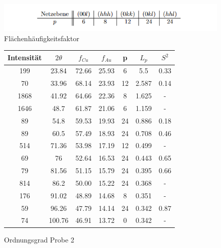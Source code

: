                \begin{figure}
                    \centering
                    \includegraphics{images/flächenhäufigkeitsfaktor.PNG}
                    \caption{Flächenhäufigkeitsfaktor}
                \end{figure}

                \begin{figure}[H]
                    \centering
                    \begin{tabular}{c | c | c | c | c | c | c}
                        Intensität & $2\theta$ & $f_{Cu}$ & $f_{Au}$ & p & $L_p$ & $S^2$\\
                        \hline
                        199 & 23.84 & 72.66 & 25.93 & 6 & 5.5 & 0.33\\
                        70 & 33.96 & 68.14 & 23.93 & 12 & 2.587 & 0.14\\
                        1868 & 41.92 & 64.66 & 22.36 & 8 & 1.625 & -\\
                        1646 & 48.7 & 61.87 & 21.06 & 6 & 1.159 & -\\
                        89 & 54.8 & 59.53 & 19.93 & 24 & 0.886 & 0.18\\
                        89 & 60.5 & 57.49 & 18.93 & 24 & 0.708 & 0.46\\
                        514 & 71.36 & 53.98 & 17.19 & 12 & 0.499 & -\\
                        69 & 76 & 52.64 & 16.53 & 24 & 0.443 & 0.65\\
                        79 & 81.56 & 51.15 & 15.79 & 24 & 0.395 & 0.66\\
                        814 & 86.2 & 50.00 & 15.22 & 24 & 0.368 & -\\
                        176 & 91.02 & 48.89 & 14.68 & 8 & 0.351 & -\\
                        59 & 96.26 & 47.79 & 14.14 & 24 & 0.342 & 0.87\\
                        74 & 100.76 & 46.91 & 13.72 & 0 & 0.342 & -\\
                    \end{tabular}
                    \caption{Ordnungsgrad Probe 2}
                \end{figure}


